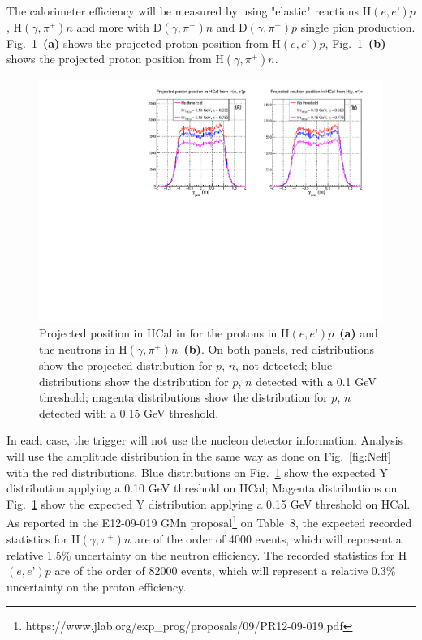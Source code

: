 The calorimeter efficiency will be measured by using "elastic" reactions H$(e,e’)p$, H$(\gamma,\pi^+)n$
and more with D$(\gamma,\pi^+)n$ and D$(\gamma,\pi^-)p$ single pion production.
Fig.~\ref{fig:Nproj}~{\bf(a)} shows the projected proton position from H$(e,e’)p$, 
Fig.~\ref{fig:Nproj}~{\bf(b)} shows the projected proton position from H$(\gamma,\pi^+)n$.
%
\begin{figure}[!h]
  \centering
  \includegraphics[width=12cm]{Answers_Readers/ProtVsNeut_CalibYproj.pdf}
  \caption{Projected position in HCal in for the protons in H$(e,e’)p$~{\bf(a)} and the neutrons in H$(\gamma,\pi^+)n$~{\bf(b)}. On both panels, red distributions show the projected distribution for $p$, $n$, not detected; blue distributions show the distribution for $p$, $n$ detected with a 0.1 GeV threshold; magenta distributions show the distribution for $p$, $n$ detected with a 0.15 GeV threshold.}
  \label{fig:Nproj}
\end{figure}
%
In each case, the trigger will not use the nucleon detector information.
Analysis will use the amplitude distribution in the same way as done on  Fig.~\ref{fig:Neff} with the red distributions.
Blue distributions on Fig.~\ref{fig:Nproj} show the expected Y distribution applying a 0.10 GeV threshold on HCal;
Magenta distributions on Fig.~\ref{fig:Nproj} show the expected Y distribution applying a 0.15 GeV threshold on HCal.
As reported in the E12-09-019 GMn proposal\footnote{https://www.jlab.org/exp\_prog/proposals/09/PR12-09-019.pdf} on Table~8, the expected recorded statistics for H$(\gamma,\pi^+)n$ are of the order of 4000 events, which will represent a relative 1.5\% uncertainty on the neutron efficiency. The recorded statistics for H$(e,e’)p$ are of the order of 82000 events, which will represent a relative 0.3\% uncertainty on the proton efficiency.\\


